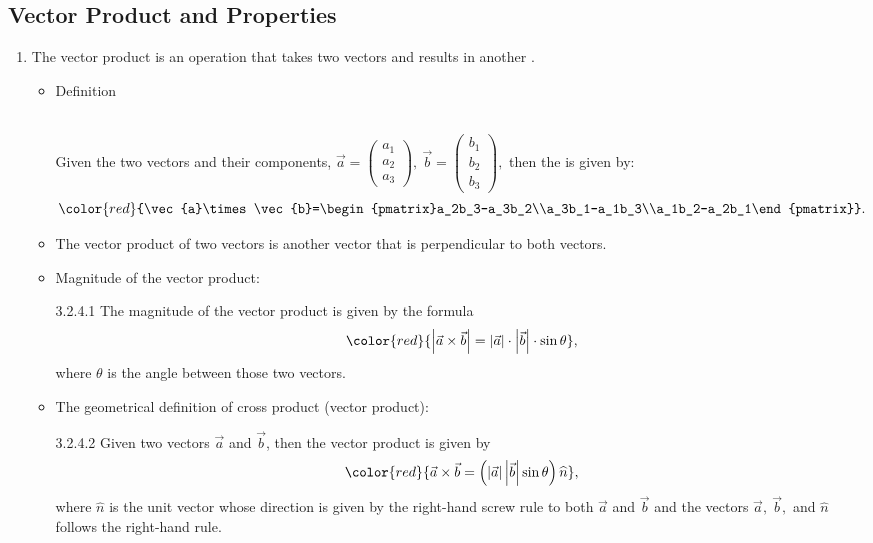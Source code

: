 \documentclass[12pt, a4paper]{article}
\begin{document}
\subsection{Vector Product and Properties}
\begin{enumerate}
  \item The vector product is an operation that takes two vectors and results in another {\color{red}{vector}}. 
  \begin{itemize}
    \item Definition
    \begin{myclaim}{ }{}
    \\Given the two vectors and their components, $\vec{a}=\begin{pmatrix}a_1\\a_2\\a_3\end{pmatrix},\ \vec{b}=\begin{pmatrix}b_1\\b_2\\b_3\end{pmatrix},$ then the \textbf{\color{red}{vector product}} is given by: 
    $${\color{red}{\vec{a}\times\vec{b}=\begin{pmatrix}a_2b_3-a_3b_2\\a_3b_1-a_1b_3\\a_1b_2-a_2b_1\end{pmatrix}}}.$$
    \end{myclaim}
    \item The vector product of two vectors is another vector that is perpendicular to both vectors. 
    \item Magnitude of the vector product: 
    \begin{theorem}{3.2.4.1}{}
      The magnitude of the vector product is given by the formula $${\color{red}{\left|\vec{a}\times\vec{b}\right|=\left|\vec{a}\right|\cdot\left|\vec{b}\right|\cdot\sin\theta}},$$
      where $\theta$ is the angle between those two vectors. 
      {}
    \end{theorem} 
    \item The geometrical definition of cross product (vector product): 
    \begin{theorem}{3.2.4.2}{}
      Given two vectors $\vec{a}$ and $\vec{b}$, then the vector product is given by $${\color{red}{\vec{a}\times\vec{b}=\left(\left|\vec{a}\right|\left|\vec{b}\right|\sin\theta\right)\widehat{n}}},$$
      where $\widehat{n}$ is the unit vector whose direction is given by the right-hand screw rule to both $\vec{a}$ and $\vec{b}$ and the vectors $\vec{a},\ \vec{b},$ and $\widehat{n}$ follows the right-hand rule. 

\end{theorem}
\end{itemize}
\end{enumerate}
\end{document}
